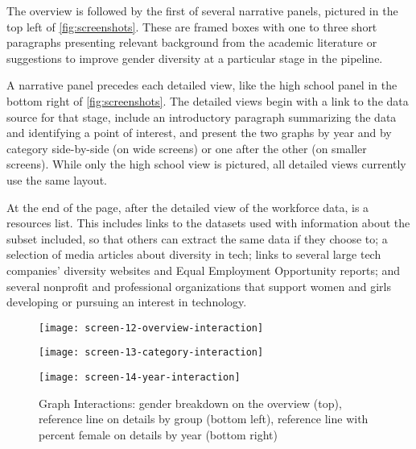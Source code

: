The overview is followed by the first of several narrative panels, pictured in the top left of \autoref{fig:screenshots}. These are framed boxes with one to three short paragraphs presenting relevant background from the academic literature or suggestions to improve gender diversity at a particular stage in the pipeline.

A narrative panel precedes each detailed view, like the high school panel in the bottom right of \autoref{fig:screenshots}. The detailed views begin with a link to the data source for that stage, include an introductory paragraph summarizing the data and identifying a point of interest, and present the two graphs by year and by category side-by-side (on wide screens) or one after the other (on smaller screens). While only the high school view is pictured, all detailed views currently use the same layout.

At the end of the page, after the detailed view of the workforce data, is a resources list. This includes links to the datasets used with information about the subset included, so that others can extract the same data if they choose to; a selection of media articles about diversity in tech; links to several large tech companies' diversity websites and Equal Employment Opportunity reports; and several nonprofit and professional organizations that support women and girls developing or pursuing an interest in technology.

\begin{figure}
  \texttt{[image: screen-12-overview-interaction]}

  \begin{minipage}{0.5\textwidth}
    \texttt{[image: screen-13-category-interaction]}
  \end{minipage}
  \begin{minipage}{0.5\textwidth}
    \texttt{[image: screen-14-year-interaction]}
  \end{minipage}
  \caption{Graph Interactions: gender breakdown on the overview (top), reference line on details by group (bottom left), reference line with percent female on details by year (bottom right)}\label{fig:interactions}
\end{figure}

